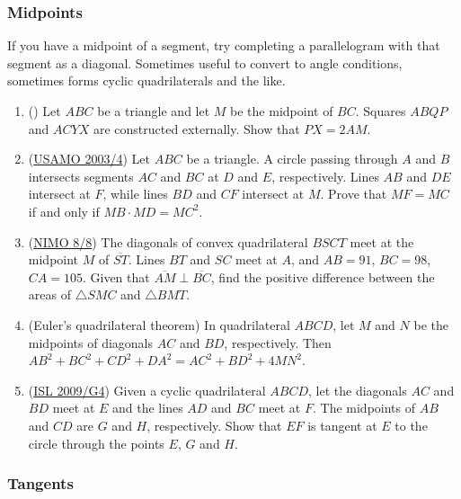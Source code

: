 \documentclass[11pt,paper=letter]{scrartcl}
\begin{document}
\subsubsection*{Midpoints}

If you have a midpoint of a segment, try completing a parallelogram with that segment as a diagonal. Sometimes useful to convert to angle conditions, sometimes forms cyclic quadrilaterals and the like.

\begin{enumerate}
  \item (\cite{A}) Let $ABC$ be a triangle and let $M$ be the midpoint of $BC$. Squares $ABQP$ and $ACYX$ are constructed externally. Show that $PX = 2AM$.

  \item (\href{https://aops.com/community/c6h53670}{USAMO 2003/4}) Let $ABC$ be a triangle. A circle passing through $A$ and $B$ intersects segments $AC$ and $BC$ at $D$ and $E$, respectively. Lines $AB$ and $DE$ intersect at $F$, while lines $BD$ and $CF$ intersect at $M$. Prove that $MF = MC$ if and only if $MB\cdot MD = MC^2$. 

  \item (\href{https://aops.com/community/c139h555561}{NIMO 8/8}) The diagonals of convex quadrilateral $BSCT$ meet at the midpoint $M$ of $\overline{ST}$. Lines $BT$ and $SC$ meet at $A$, and $AB = 91$, $BC = 98$, $CA = 105$. Given that $\overline{AM} \perp \overline{BC}$, find the positive difference between the areas of $\triangle SMC$ and $\triangle BMT$. 

  \item (Euler's quadrilateral theorem) In quadrilateral $ABCD$, let $M$ and $N$ be the midpoints of diagonals $AC$ and $BD$, respectively. Then $AB^2 + BC^2 + CD^2 + DA^2 = AC^2 + BD^2 + 4MN^2$.

  \item (\href{https://aops.com/community/c6h355791}{ISL 2009/G4}) Given a cyclic quadrilateral $ABCD$, let the diagonals $AC$ and $BD$ meet at $E$ and the lines $AD$ and $BC$ meet at $F$. The midpoints of $AB$ and $CD$ are $G$ and $H$, respectively. Show that $EF$ is tangent at $E$ to the circle through the points $E$, $G$ and $H$. 
\end{enumerate}

\subsubsection*{Tangents}
\end{document}
